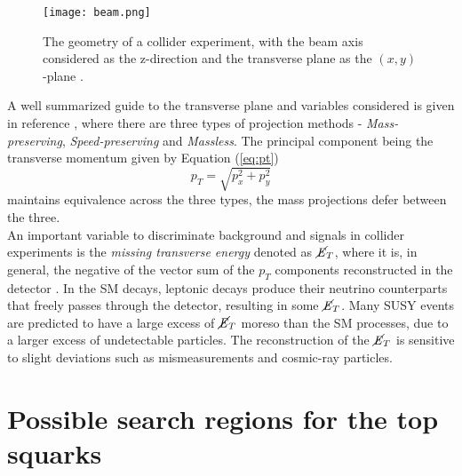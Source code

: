 \begin{figure}[htbp]
    \centering
    \texttt{[image: beam.png]}
    \caption{The geometry of a collider experiment, with the beam axis considered as the z-direction and the transverse plane as the $(x,y)$-plane \cite{barr2011guide}.}
    \label{fig:beam}
\end{figure}


A well summarized guide to the transverse plane and variables considered is given in reference \cite{barr2011guide}, where there are three types of projection methods - \textit{Mass-preserving}, \textit{Speed-preserving} and \textit{Massless}. The principal component being the transverse momentum given by Equation (\ref{eq:pt})
\begin{equation}
    p_T = \sqrt{p_x^2 + p_y^2}
    \label{eq:pt}
\end{equation}
maintains equivalence across the three types, the mass projections defer between the three. \\

An important variable to discriminate background and signals in collider experiments is the \textit{missing transverse energy} denoted as $\cancel{\it{E}}_{T}$, where it is, in general, the negative of the vector sum of the $p_T$ components reconstructed in the detector \cite{cms2011missing}. In the SM decays, leptonic decays produce their neutrino counterparts that freely passes through the detector, resulting in some $\cancel{\it{E}}_{T}$. Many SUSY events are predicted to have a large excess of $\cancel{\it{E}}_{T}$ moreso than the SM processes, due to a larger excess of undetectable particles. The reconstruction of the $\cancel{\it{E}}_{T}$ is sensitive to slight deviations such as mismeasurements and cosmic-ray particles.  %



\section{Possible search regions for the top squarks}


